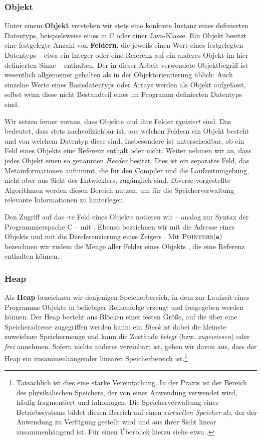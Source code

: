 \subsubsection*{Objekt}
Unter einem \textbf{Objekt} verstehen wir stets eine konkrete Instanz eines definierten Datentyps, beispielsweise eines  in C oder einer Java-Klasse.
Ein Objekt besitzt eine festgelegte Anzahl von \textbf{Feldern}, die jeweils einen Wert eines festgelegten Datentyps -- etwa ein Integer oder eine Referenz auf ein anderes Objekt im hier definierten Sinne -- enthalten.
Der in dieser Arbeit verwendete Objektbegriff ist wesentlich allgemeiner gehalten als in der Objektorientierung üblich:
Auch einzelne Werte eines Basisdatentyps oder Arrays werden als Objekt aufgefasst, selbst wenn diese nicht Bestandteil eines im Programm definierten Datentyps sind.

Wir setzen ferner voraus, dass Objekte und ihre Felder \textit{typisiert} sind.
Das bedeutet, dass stets nachvollziehbar ist, aus welchen Feldern ein Objekt besteht und von welchem Datentyp diese sind.
Insbesondere ist unterscheidbar, ob ein Feld eines Objekts eine Referenz enthält oder nicht.
Weiter nehmen wir an, dass jedes Objekt einen so genannten \textit{Header} besitzt.
Dies ist ein separates Feld, das Metainformationen aufnimmt, die für den Compiler und die Laufzeitumgebung, nicht aber aus Sicht des Entwicklers, zugänglich sind.
Diverse vorgestellte Algorithmen werden diesen Bereich nutzen, um für die Speicherverwaltung relevante Informationen zu hinterlegen.

Den Zugriff auf das -te Feld eines Objekts  notieren wir -- analog zur Syntax der Programmierspache C -- mit .
Ebenso bezeichnen wir mit  die Adresse eines Objekts und mit  die Dereferenzierung eines Zeigers .
Mit $\textsc{Pointers}(\texttt{a})$ bezeichnen wir zudem die Menge aller Felder eines Objekts , die eine Referenz enthalten können.

\subsubsection*{Heap}
Als \textbf{Heap} bezeichnen wir denjenigen Speicherbereich, in dem zur Laufzeit eines Programms Objekte in beliebiger Reihenfolge erzeugt und freigegeben werden können.
Der Heap besteht aus Blöcken einer festen Größe, auf die über eine Speicheradresse zugegriffen werden kann; ein \textit{Block} ist dabei die kleinste zuweisbare Speichermenge und kann die Zustände \textit{belegt} (bzw. \textit{zugewiesen}) oder \textit{frei} annehmen.
Sofern nichts anderes vereinbart ist, gehen wir davon aus, dass der Heap ein zusammenhängender linearer Speicherbereich ist.\footnote{Tatsächlich ist dies eine starke Vereinfachung. In der Praxis ist der Bereich des physikalischen Speichers, der von einer Anwendung verwendet wird, häufig fragmentiert und inhomogen. Die Speicherverwaltung eines Betriebssystems bildet diesen Bereich auf einen \textit{virtuellen Speicher} ab, der der Anwendung zu Verfügung gestellt wird und aus ihrer Sicht linear zusammenhängend ist. Für einen Überblick hierzu siehe etwa \cite[Kap. 3.3]{tanenbaum}.}


